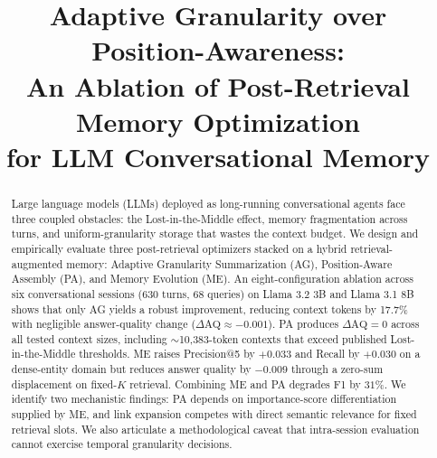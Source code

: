 \documentclass[conference]{IEEEtran}
\begin{document}
\title{Adaptive Granularity over Position-Awareness:\\
An Ablation of Post-Retrieval Memory Optimization\\
for LLM Conversational Memory}

\author{
\and
{}
\and
{}
}

\maketitle

\begin{abstract}
Large language models (LLMs) deployed as long-running conversational agents face three coupled obstacles: the Lost-in-the-Middle effect, memory fragmentation across turns, and uniform-granularity storage that wastes the context budget. We design and empirically evaluate three post-retrieval optimizers stacked on a hybrid retrieval-augmented memory: Adaptive Granularity Summarization (AG), Position-Aware Assembly (PA), and Memory Evolution (ME). An eight-configuration ablation across six conversational sessions (630 turns, 68 queries) on Llama 3.2 3B and Llama 3.1 8B shows that only AG yields a robust improvement, reducing context tokens by 17.7\% with negligible answer-quality change ($\Delta\mathrm{AQ}\approx-0.001$). PA produces $\Delta\mathrm{AQ}=0$ across all tested context sizes, including $\sim$10{,}383-token contexts that exceed published Lost-in-the-Middle thresholds. ME raises Precision@5 by $+0.033$ and Recall by $+0.030$ on a dense-entity domain but reduces answer quality by $-0.009$ through a zero-sum displacement on fixed-$K$ retrieval. Combining ME and PA degrades F1 by $31$\%. We identify two mechanistic findings: PA depends on importance-score differentiation supplied by ME, and link expansion competes with direct semantic relevance for fixed retrieval slots. We also articulate a methodological caveat that intra-session evaluation cannot exercise temporal granularity decisions.
\end{abstract}
\end{document}
